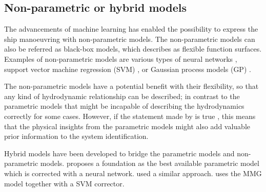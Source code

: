 \subsection{Non-parametric or hybrid models} \label{sec:non-parametric_models}
The advancements of machine learning has enabled the possibility to express the ship manoeuvring with non-parametric models. The non-parametric models can also be referred as black-box models, which \textcite{ljungPerspectivesSystemIdentification2010} describes as flexible function surfaces.
Examples of non-parametric models are various types of neural networks \cite{rajeshSystemIdentificationNonlinear2008,heBlackBoxModelingShip2020,heNonparametricModelingShip2022}, support vector machine regression (SVM) \cite{chenOnlineModelingPrediction2023,zihaowangKernelbasedSupportVector2020}, or Gaussian process models (GP) \cite{zhangLocallyWeightedNonParametric2021,xueIdentificationPredictionShip2021,xueOnlineIdentificationShip2022}.  

The non-parametric models have a potential benefit with their flexibility, so that any kind of hydrodynamic relationship can be described; in contrast to the parametric models that might be incapable of describing the hydrodynamics correctly for some cases. However, if the statement made by \textcite{revestidoherreroTwostepIdentificationNonlinear2012} is true , this means that the physical insights from the parametric models might also add valuable prior information to the system identification.

Hybrid models have been developed to bridge the parametric models and non-parametric models. \textcite{wangIncorporatingApproximateDynamics2021} proposes a foundation as the best available parametric model which is corrected with a neural network. \textcite{nielsenMachineLearningEnhancement2022} used a similar approach. \textcite{dongMathdataIntegratedPrediction2023a} uses the MMG model together with a SVM corrector.



